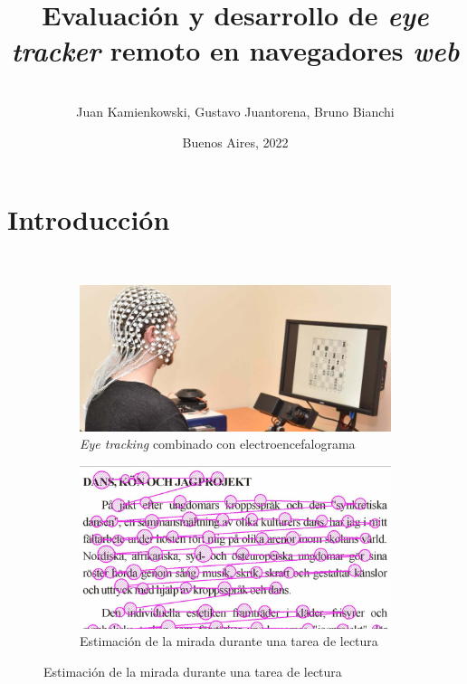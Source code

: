 \documentclass[aspectratio=169]{beamer}
\title{Evaluación y desarrollo de \textit{eye tracker} remoto en navegadores
\textit{web}}
\author{\makebox[.9\textwidth]{\Large Francisco Figari}\\Juan Kamienkowski, Gustavo Juantorena, Bruno Bianchi}
\date{Buenos Aires, 2022}
\begin{document}
\frame{\titlepage}

\section{Introducción}

\begin{frame}{~}

  \begin{figure}
    \begin{subfigure}{0.49\textwidth}
      \centering
      \includegraphics[width=\linewidth]{img/eye-link-eeg.jpg}
      \caption{\textit{Eye tracking} combinado con electroencefalograma}
    \end{subfigure}
    \begin{subfigure}{0.49\textwidth}
      \centering
      \includegraphics[width=\linewidth]{img/reading-fixations-saccades.jpg}
      \caption{Estimación de la mirada durante una tarea de lectura}
    \end{subfigure}
  \end{figure}

\end{frame}
\end{document}
